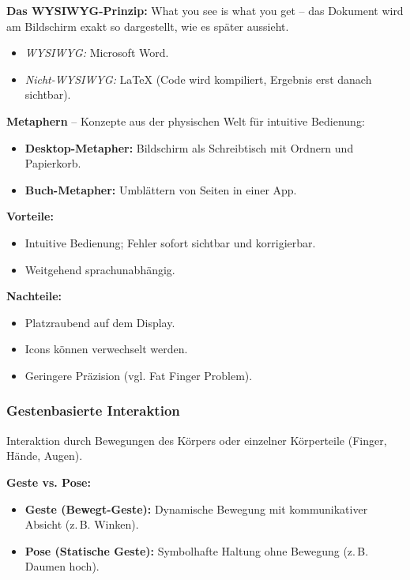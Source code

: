 \documentclass[12pt, a4paper]{article}
\begin{document}
\textbf{Das WYSIWYG-Prinzip:} \glqq{}What you see is what you get\grqq{} --
das Dokument wird am Bildschirm exakt so dargestellt, wie es später aussieht.
\begin{itemize}
  \item \textit{WYSIWYG:} Microsoft Word.
  \item \textit{Nicht-WYSIWYG:} \LaTeX{} (Code wird kompiliert, Ergebnis erst danach
        sichtbar).
\end{itemize}

\textbf{Metaphern} -- Konzepte aus der physischen Welt für intuitive Bedienung:
\begin{itemize}
  \item \textbf{Desktop-Metapher:} Bildschirm als Schreibtisch mit Ordnern und
        Papierkorb.
  \item \textbf{Buch-Metapher:} Umblättern von Seiten in einer App.
\end{itemize}

\textbf{Vorteile:}
\begin{itemize}
  \item Intuitive Bedienung; Fehler sofort sichtbar und korrigierbar.
  \item Weitgehend sprachunabhängig.
\end{itemize}

\textbf{Nachteile:}
\begin{itemize}
  \item Platzraubend auf dem Display.
  \item Icons können verwechselt werden.
  \item Geringere Präzision (vgl. \glqq{}Fat Finger Problem\grqq{}).
\end{itemize}

\subsubsection{Gestenbasierte Interaktion}

Interaktion durch Bewegungen des Körpers oder einzelner Körperteile (Finger, Hände,
Augen).

\textbf{Geste vs. Pose:}
\begin{itemize}
  \item \textbf{Geste (Bewegt-Geste):} Dynamische Bewegung mit kommunikativer
        Absicht (z.\,B. Winken).
  \item \textbf{Pose (Statische Geste):} Symbolhafte Haltung ohne Bewegung
        (z.\,B. \glqq{}Daumen hoch\grqq{}).
\end{itemize}
\end{document}
